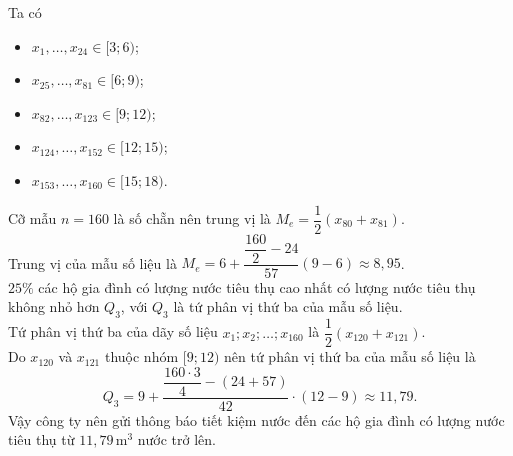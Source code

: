 \begin{ex}
{\begin{itemchoice}
			Ta  có
			\begin{itemize}
				\item $x_1, \ldots, x_{24} \in  [3;6)$;
				\item $x_{25}, \ldots, x_{81} \in  [6;9)$;
				\item $x_{82}, \ldots, x_{123} \in [9;12)$; 
				 \item $x_{124}, \ldots, x_{152} \in [12;15)$;
				 \item $x_{153}, \ldots, x_{160} \in [15;18)$.
			\end{itemize}
			Cỡ mẫu $n=160$ là số chẵn nên  trung vị là $M_e=\dfrac{1}{2} \left(x_{80}+x_{81} \right)$.\\
			Trung vị của mẫu số liệu  là $M_e=6+\dfrac{\dfrac{160}{2}-24}{57} \left(9-6\right)\approx 8{,}95$.\\
			$25\%$ các  hộ gia đình có lượng nước tiêu thụ cao nhất có lượng nước tiêu thụ không nhỏ hơn $Q_3$, với $Q_3$ là tứ phân vị thứ ba của mẫu số liệu.\\
			Tứ phân vị thứ ba của dãy số liệu $x_1;x_2;\ldots;x_{160}$ là  $\dfrac{1}{2} \left(x_{120}+x_{121} \right)$.\\
			Do $x_{120}$ và $x_{121}$ thuộc nhóm $[9;12)$  nên tứ phân vị thứ ba của mẫu số liệu là
			\[Q_3=9+\dfrac{\dfrac{160\cdot 3}{4}-(24+57)}{42} \cdot  (12-9)\approx 11{,}79.
			\] 
			Vậy công ty nên gửi thông báo tiết kiệm nước đến các hộ gia đình có lượng nước tiêu  thụ từ $11{,}79$\,m$^3$ nước trở lên.
		\end{itemchoice}
	 }
\end{ex}

